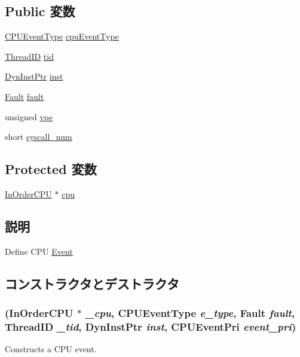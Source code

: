 \subsection*{Public 変数}
\begin{DoxyCompactItemize}
\item 
\hyperlink{classInOrderCPU_aedc081b7a3ef1b1568e62dec4a64c1ca}{CPUEventType} \hyperlink{classInOrderCPU_1_1CPUEvent_a1d7991b1086b0b7a527e5cf9f901d649}{cpuEventType}
\item 
\hyperlink{base_2types_8hh_ab39b1a4f9dad884694c7a74ed69e6a6b}{ThreadID} \hyperlink{classInOrderCPU_1_1CPUEvent_aa508770268ee4ceaf16054b9e0be0e17}{tid}
\item 
\hyperlink{classRefCountingPtr}{DynInstPtr} \hyperlink{classInOrderCPU_1_1CPUEvent_af5d4fb974eeb4507d4c837d365d0cefc}{inst}
\item 
\hyperlink{classRefCountingPtr}{Fault} \hyperlink{classInOrderCPU_1_1CPUEvent_a68714ceb74c60ea7ef5dec335bb6c5d7}{fault}
\item 
unsigned \hyperlink{classInOrderCPU_1_1CPUEvent_a7da7803c689c7ae0b8e8b2cb5efcd8c2}{vpe}
\item 
short \hyperlink{classInOrderCPU_1_1CPUEvent_a0bbcec1ffea6f107bb549f4c623683f1}{syscall\_\-num}
\end{DoxyCompactItemize}
\subsection*{Protected 変数}
\begin{DoxyCompactItemize}
\item 
\hyperlink{classInOrderCPU_1_1InOrderCPU}{InOrderCPU} $\ast$ \hyperlink{classInOrderCPU_1_1CPUEvent_a41d682c28d0f49e04393c52815808782}{cpu}
\end{DoxyCompactItemize}


\subsection{説明}
Define CPU \hyperlink{classEvent}{Event} 

\subsection{コンストラクタとデストラクタ}
\hypertarget{classInOrderCPU_1_1CPUEvent_ae9e21ea59aa814f54bf9cbe72ac632d5}{
\subsubsection[{CPUEvent}]{ ({\bf InOrderCPU} $\ast$ {\em \_\-cpu}, \/  {\bf CPUEventType} {\em e\_\-type}, \/  {\bf Fault} {\em fault}, \/  {\bf ThreadID} {\em \_\-tid}, \/  {\bf DynInstPtr} {\em inst}, \/  {\bf CPUEventPri} {\em event\_\-pri})}}
\label{classInOrderCPU_1_1CPUEvent_ae9e21ea59aa814f54bf9cbe72ac632d5}
Constructs a CPU event. 


